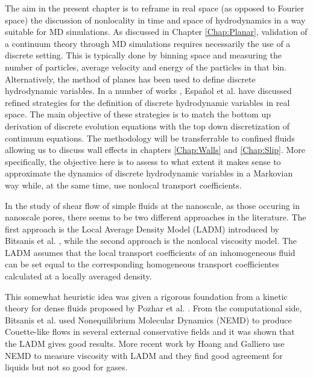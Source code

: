 \documentclass[b5paper,openright,10pt]{book}
\begin{document}
The aim in the present chapter is to reframe in  real space (as opposed
to Fourier space) the discussion of  nonlocality in time and space of
hydrodynamics in  a way suitable  for MD simulations. As  discussed in
Chapter \ref{Chap:Planar},  validation of  a continuum  theory
through  MD simulations  requires necessarily  the use  of a  discrete
setting.  This  is typically done  by binning space and  measuring the
number of particles,  average velocity and energy of  the particles in
that     bin.      Alternatively,     the     method     of     planes
\cite{Davis1996,Travis2000}   has  been   used   to  define   discrete
hydrodynamic     variables.      In      a     number     of     works
\cite{Espanol2009i,DelaTorre2011,DelaTorre2015,EspanolDonev2015},   Español et al.
have  discussed  refined strategies  for  the  definition of  discrete
hydrodynamic variables  in real  space.  The  main objective  of these
strategies is to match the  bottom up derivation of discrete evolution
equations with the top down  discretization of continuum equations. 
The  methodology will be  transferrable to
confined fluids allowing  us to discuss wall  effects in chapters \ref{Chap:Walls} and \ref{Chap:Slip}.  More  specifically, the
objective  here  is  to  assess  to what  extent  it  makes  sense  to
approximate  the  dynamics of  discrete  hydrodynamic  variables in  a
Markovian  way  while,  at  the same  time,  use  nonlocal  transport
coefficients. 

In the study of shear flow of simple fluids at the nanoscale, as those
occuring  in  nanoscale  pores,  there   seems  to  be  two  different
approaches in the literature.  The first approach is the Local Average
Density Model  (LADM) introduced by Bitsanis  et al.  \cite{Bitsanis1987},
while the second  approach is the nonlocal viscosity  model. 
The LADM assumes that the local transport coefficients of an inhomogeneous
fluid can be set equal to the corresponding homogeneous transport coefficientes calculated at a locally averaged density. 

This somewhat  heuristic idea
was given a rigorous foundation from a kinetic theory for dense fluids
proposed by Pozhar et al.  \cite{Pozhar1991a}.  From the computational
side,   Bitsanis  et   al.  \cite{Bitsanis1987}   used  Nonequilibrium
Molecular  Dynamics (NEMD)  to produce  Couette-like flows  in several
external conservative fields and it was shown that the LADM gives good
results.    More     recent    work    by    Hoang     and    Galliero
\cite{Hoang2012a,Hoang2012b} use  NEMD to  measure viscosity
with LADM and they find good agreement for liquids but not so good for
gases.
\end{document}
